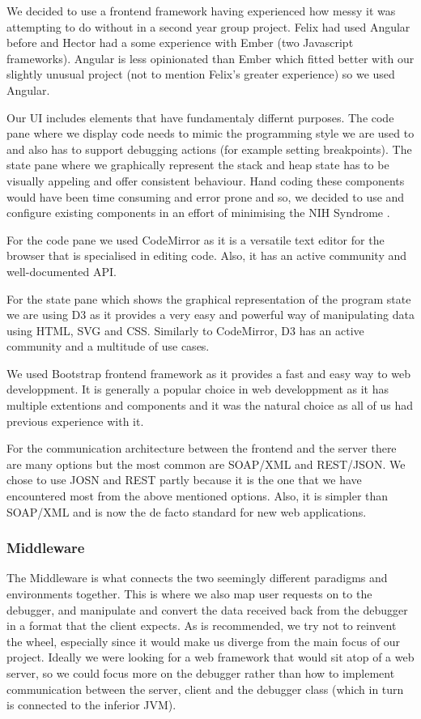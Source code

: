 \documentclass[11pt, a4paper]{article}
\begin{document}
We decided to use a frontend framework having experienced how messy it was attempting to do without in a second year group project.
Felix had used Angular before and Hector had a some experience with Ember (two Javascript frameworks).
Angular is less opinionated than Ember which fitted better with our slightly unusual project (not to mention Felix's greater experience) so we used Angular.

Our UI includes elements that have fundamentaly differnt purposes.
The code pane where we display code needs to mimic the programming style we are used to and also has to support debugging actions (for example setting breakpoints). 
The state pane where we graphically represent the stack and heap state has to be visually appeling and offer consistent behaviour.
Hand coding these components would have been time consuming and error prone and so, we decided to use and configure existing components in an effort of minimising the NIH Syndrome \cite{NIH}.

For the code pane we used CodeMirror\cite{CodeMirror} as it is a versatile text editor for the browser that is specialised in editing code. 
Also, it has an active community and well-documented API.

For the state pane which shows the graphical representation of the program state we are using D3\cite{D3} as it provides a very easy and powerful way of manipulating data using HTML, SVG and CSS. 
Similarly to CodeMirror, D3 has an active community and a multitude of use cases.

We used Bootstrap\cite{Bootstrap} frontend framework as it provides a fast and easy way to web developpment.
It is generally a popular choice in web developpment as it has multiple extentions and components and it was the natural choice as all of us had previous experience with it.

For the communication architecture between the frontend and the server there are many options but the most common are SOAP/XML and REST/JSON.
We chose to use JOSN and REST partly because it is the one that we have encountered most from the above mentioned options. 
Also, it is simpler than SOAP/XML and is now the de facto standard for new web applications.

\subsubsection{Middleware}
The Middleware is what connects the two seemingly different paradigms and
environments together.  This is where we also map user requests on to the
debugger, and manipulate and convert the data received back from the debugger in
a format that the client expects.  As is recommended, we try not to reinvent the
wheel, especially since it would make us diverge from the main focus of our
project.  Ideally we were looking for a web framework that would sit atop of a
web server, so we could focus more on the debugger rather than how to implement
communication between the server, client and the debugger class (which in turn
is connected to the inferior JVM).
\end{document}
